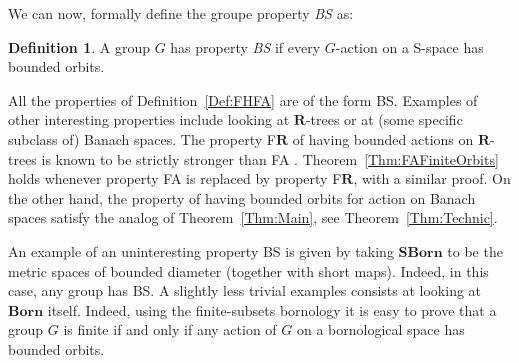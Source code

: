 \documentclass[a4paper]{article}
\theoremstyle{definition}
\newtheorem{defn}[lem]{Definition}
\newtheorem{rem}[lem]{Remark}
\newcommand*{\field}[1]{\mathbf{#1}}
\newcommand*{\R}{\field{R}}
\begin{document}
We can now, formally define the groupe property \emph{BS} as:
%
\begin{defn}
A group $G$ has property \emph{BS} if every $G$-action on a S-space has bounded orbits.
\end{defn}




%
%
%
All the properties of Definition~\ref{Def:FHFA} are of the form BS.
Examples of other interesting properties include looking at $\mathbf{R}$-trees or at (some specific subclass of) Banach spaces.
The property F$\mathbf{R}$ of having bounded actions on $\mathbf{R}$-trees is known to be strictly stronger than FA \cite{MR3465847}. Theorem~\ref{Thm:FAFiniteOrbits} holds whenever property FA is replaced by property F$\mathbf{R}$, with a similar proof.
On the other hand, the property of having bounded orbits for action on Banach spaces satisfy the analog of Theorem~\ref{Thm:Main}, see Theorem~\ref{Thm:Technic}.

An example of an uninteresting property BS is given by taking $\mathbf{SBorn}$ to be the metric spaces of bounded diameter (together with short maps). Indeed, in this case, any group has BS.
A slightly less trivial examples consists at looking at $\mathbf{Born}$ itself.
Indeed, using the finite-subsets bornology it is easy to prove that a group $G$ is finite if and only if any action of $G$ on a bornological space has bounded orbits.
\end{document}
